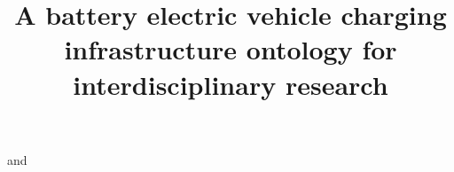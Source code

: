 \documentclass{IOS-Book-Article}
\theoremstyle{empty}
\theoremstyle{emptybreak}
\def\hb{\hbox to 11.5 cm{}}
\begin{document}
\pagestyle{headings}
\def\thepage{}
\begin{frontmatter}              %


\title{A battery electric vehicle charging infrastructure ontology for interdisciplinary research}


\author[A]{ }%
\author[A]{ }
and
\author[A]{ }
\author[A]{ }

\address[A]{German Aerospace Center (DLR), Department of Energy Systems Analysis, Institute of Networked
Energy Systems, Stuttgart, Germany}


\begin{keyword}

\end{keyword}
\end{frontmatter}















\end{document}

